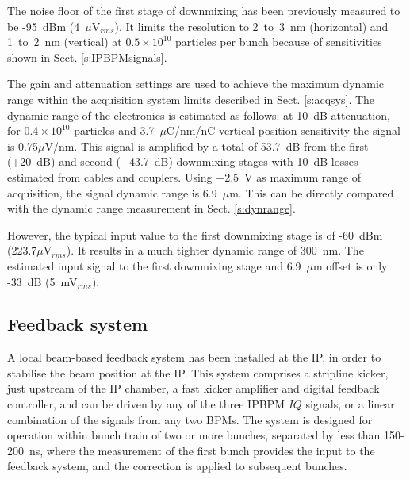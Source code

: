 The noise floor of the first stage of downmixing has been previously measured to be -95~dBm (4~$\mu$V$_{rms}$). It limits the resolution to 2~to~3~nm (horizontal) and 1~to~2~nm (vertical) at $0.5\times10^{10}$ particles per bunch because of sensitivities shown in Sect. \ref{s:IPBPMsignals}.\par
The gain and attenuation settings are used to achieve the maximum dynamic range within the acquisition system limits described in Sect. \ref{s:acqsys}.
The dynamic range of the electronics is estimated as follows: at 10~dB attenuation, for $0.4\times10^{10}$ particles and 3.7~$\mu$C/nm/nC vertical position sensitivity the signal is 0.75$\mu$V/nm. This signal is amplified by a total of 53.7~dB from the first (+20~dB) and second (+43.7~dB) downmixing stages with 10~dB losses estimated from cables and couplers. Using +2.5~V as maximum range of acquisition, the signal dynamic range is 6.9~$\mu$m. This can be directly compared with the dynamic range measurement in Sect. \ref{s:dynrange}.\par
However, the typical input value to the first downmixing stage is of -60~dBm (223.7$\mu$V$_{rms}$). It results in a much tighter dynamic range of 300~nm. The estimated input signal to the first downmixing stage and 6.9~$\mu$m offset is only -33~dB (5~mV$_{rms}$).\par
\subsection{Feedback system}
A local beam-based feedback system has been installed at the IP, in order to stabilise the beam position at the IP. This system comprises a stripline kicker, just upstream of the IP chamber, a fast kicker amplifier and digital feedback controller, and can be driven by any of the three IPBPM $IQ$ signals, or a linear combination of the signals from any two BPMs. The system is designed for operation within bunch train of two or more bunches, separated by less than 150-200~ns, where the measurement of the first bunch provides the input to the feedback system, and the correction is applied to subsequent bunches.\par
